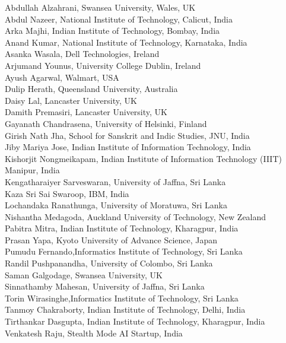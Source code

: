 \documentclass[11pt,a4paper]{article}
\begin{document}
Abdullah Alzahrani, Swansea University, Wales, UK \\
Abdul Nazeer, National Institute of Technology, Calicut, India \\
Arka Majhi, Indian Institute of Technology, Bombay, India \\
Anand Kumar, National Institute of Technology, Karnataka, India \\
Asanka Wasala, Dell Technologies, Ireland \\
Arjumand Younus, University College Dublin, Ireland \\
Ayush Agarwal, Walmart, USA \\
Dulip Herath, Queensland University, Australia \\
Daisy Lal, Lancaster University, UK \\
Damith Premasiri, Lancaster University, UK \\
Gayanath Chandrasena, University of Helsinki, Finland \\
Girish Nath Jha, School for Sanskrit and Indic Studies, JNU, India \\
Jiby Mariya Jose, Indian Institute of Information Technology, India \\
Kishorjit Nongmeikapam, Indian Institute of Information Technology (IIIT) Manipur, India \\
Kengatharaiyer Sarveswaran, University of Jaffna, Sri Lanka \\
Kaza Sri Sai Swaroop, IBM, India \\
Lochandaka Ranathunga, University of Moratuwa, Sri Lanka \\
Nishantha Medagoda, Auckland University of Technology, New Zealand \\
Pabitra Mitra, Indian Institute of Technology, Kharagpur, India \\
Prasan Yapa, Kyoto University of Advance Science, Japan \\ 
Pumudu Fernando,Informatics Institute of Technology, Sri Lanka\\
Randil Pushpanandha, University of Colombo, Sri Lanka \\
Saman Galgodage, Swansea University, UK \\
Sinnathamby Mahesan, University of Jaffna, Sri Lanka \\
Torin Wirasinghe,Informatics Institute of Technology, Sri Lanka \\
Tanmoy Chakraborty, Indian Institute of Technology, Delhi, India \\
Tirthankar Dasgupta, Indian Institute of Technology, Kharagpur, India \\
Venkatesh Raju, Stealth Mode AI Startup, India
\end{document}
